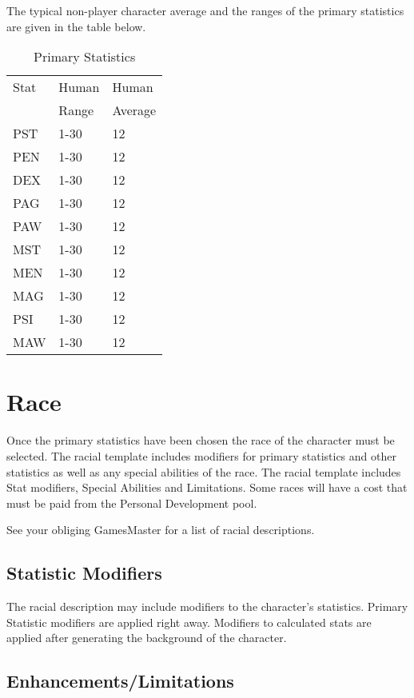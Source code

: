 The typical non-player character average and the ranges of the primary statistics are given in the table
below.

\begin{table}[h]
	\begin{tabular}{lll}
	Stat & Human    & Human   \\
         & Range	& Average  \\
	\hline
	PST & 1-30		& 12  \\
	PEN & 1-30		& 12  \\
	DEX & 1-30		& 12  \\
	PAG & 1-30		& 12  \\
	PAW & 1-30		& 12  \\
	MST & 1-30		& 12  \\
	MEN & 1-30		& 12  \\
	MAG & 1-30		& 12  \\
	PSI & 1-30		& 12  \\
	MAW & 1-30		& 12  \\
	\end{tabular}
    \caption{Primary Statistics}
\end{table}

\section{Race}

Once the primary statistics have been chosen the race of the character
must be selected. The racial template includes modifiers for primary
statistics and other statistics as well as any special abilities of the
race. The racial template includes Stat modifiers, Special Abilities and
Limitations. Some races will have a cost that must be paid from the 
Personal Development pool.

See your obliging GamesMaster for a list of racial descriptions.

\subsection{Statistic Modifiers}

The racial description may include modifiers to the character's statistics.
Primary Statistic modifiers are applied right away. Modifiers to calculated 
stats are applied after generating the background of the character.

\subsection{Enhancements/Limitations}

